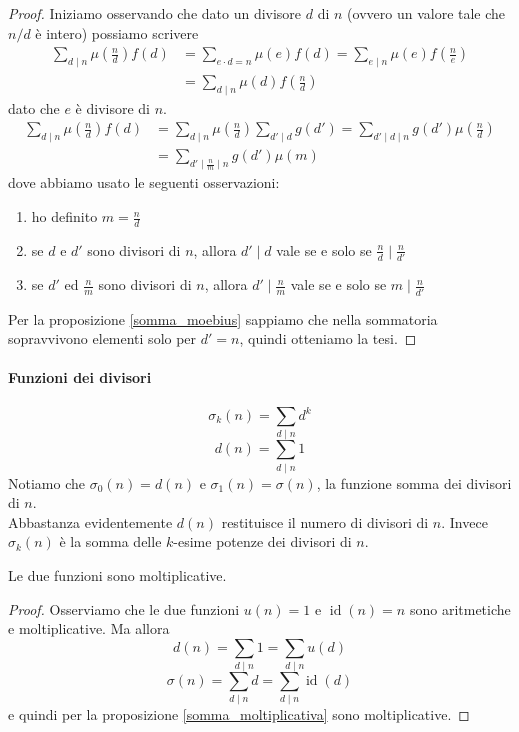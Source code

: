 \begin{proof}
	Iniziamo osservando che dato un divisore $d$ di $n$ (ovvero un valore tale che $n/d$ è intero) possiamo scrivere
	\begin{align*}
	\sum_{d\mid n}\mu\left(\frac{n}{d}\right)f(d)&=\sum_{e\cdot d=n}\mu(e)f(d)=\sum_{e\mid n}\mu(e)f\left(\frac{n}{e}\right)\\
	&=\sum_{d\mid n}\mu(d)f\left(\frac{n}{d}\right)
	\end{align*}
	dato che $e$ è divisore di $n$.
	\begin{align*}
	\sum_{d\mid n}\mu\left(\frac{n}{d}\right)f(d)&=\sum_{d\mid n}\mu\left(\frac{n}{d}\right)\sum_{d'\mid d}g(d')=\sum_{d'\mid d\mid n}g(d')\mu\left(\frac{n}{d}\right)\\
	&=\sum_{d'\mid \frac{n}{m}\mid n}g(d')\mu\left(m\right)
	\end{align*}
	dove abbiamo usato le seguenti osservazioni:
	\begin{enumerate}
		\item ho definito $m=\frac{n}{d}$
		\item se $d$ e $d'$ sono divisori di $n$, allora $d'\mid d$ vale se e solo se $\frac{n}{d}\mid \frac{n}{d'}$
		\item se $d'$ ed $\frac{n}{m}$ sono divisori di $n$, allora $d'\mid \frac{n}{m}$ vale se e solo se $m\mid \frac{n}{d'}$
	\end{enumerate}
	Per la proposizione \ref{somma_moebius} sappiamo che nella sommatoria sopravvivono elementi solo per $d'=n$, quindi otteniamo la tesi.
\end{proof}
\paragraph{Funzioni dei divisori}
\begin{equation*}
\sigma_k(n)=\sum_{d\mid n}d^k
\end{equation*}
\begin{equation*}
d(n)=\sum_{d\mid n}1
\end{equation*}
Notiamo che $\sigma_0(n)=d(n)$ e $\sigma_1(n)=\sigma(n)$, la funzione somma dei divisori di $n$. \\ Abbastanza evidentemente $d(n)$ restituisce il numero di divisori di $n$. Invece $\sigma_k(n)$ è la somma delle $k$-esime potenze dei divisori di $n$.
\begin{teorema}
	Le due funzioni sono moltiplicative.
\end{teorema}
\begin{proof}
	Osserviamo che le due funzioni $u(n)=1$ e $\operatorname{id}(n)=n$ sono aritmetiche e moltiplicative. Ma allora
	\begin{equation*}
	d(n)=\sum_{d\mid n}1=\sum_{d\mid n}u(d)
	\end{equation*}
	\begin{equation*}
	\sigma(n)=\sum_{d\mid n}d=\sum_{d\mid n}\operatorname{id}(d)
	\end{equation*}
	e quindi per la proposizione \ref{somma_moltiplicativa} sono moltiplicative.
\end{proof}




